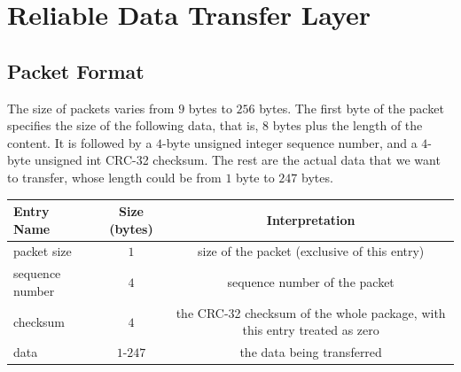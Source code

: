 \documentclass[10pt,a4paper]{article}
\begin{document}
\section{Reliable Data Transfer Layer}
\subsection{Packet Format}
    The size of packets varies from $9$ bytes to $256$ bytes. The first byte of the packet specifies the size of the following data, that is, $8$ bytes plus the length of the content. It is followed by a $4$-byte unsigned integer sequence number, and a $4$-byte unsigned int CRC-32 checksum. The rest are the actual data that we want to transfer, whose length could be from $1$ byte to $247$ bytes.

\begin{center}
    \begin{adjustwidth}{-.7cm}{2cm} %
        \begin{tabular}{lcc}
            Entry Name & Size (bytes) & Interpretation \\%
                \hline
            packet size & $1$ &  size of the packet (exclusive of this entry)\\ 
            sequence number & $4$ & sequence number of the packet\\
            checksum & $4$ & the CRC-32 checksum of the whole package, with this entry treated as zero\\
            data & $1$-$247$ & the data being transferred\\
        \end{tabular}
    \end{adjustwidth}
\end{center}
    
\end{document}
